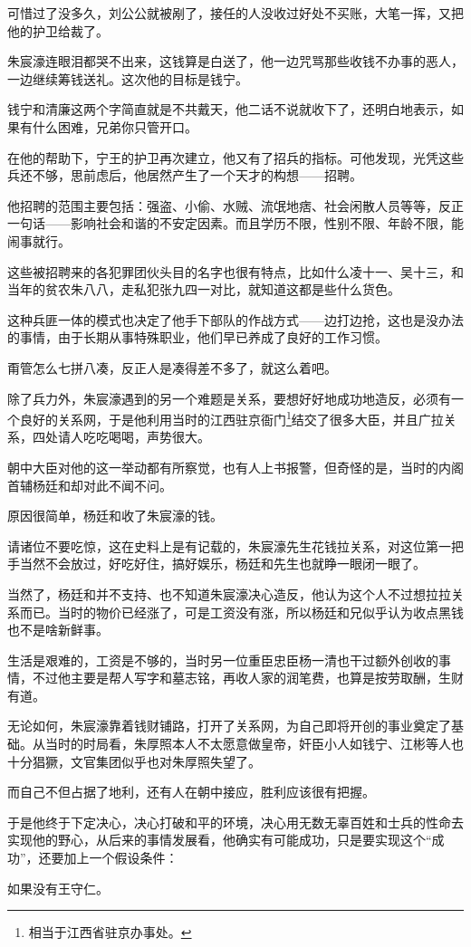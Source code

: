 \begin{multicols}{\theparacolNo}
		可惜过了没多久，刘公公就被剐了，接任的人没收过好处不买账，大笔一挥，又把他的护卫给裁了。

		朱宸濠连眼泪都哭不出来，这钱算是白送了，他一边咒骂那些收钱不办事的恶人，一边继续筹钱送礼。这次他的目标是钱宁。

		钱宁和清廉这两个字简直就是不共戴天，他二话不说就收下了，还明白地表示，如果有什么困难，兄弟你只管开口。

		在他的帮助下，宁王的护卫再次建立，他又有了招兵的指标。可他发现，光凭这些兵还不够，思前虑后，他居然产生了一个天才的构想——招聘。

		他招聘的范围主要包括：强盗、小偷、水贼、流氓地痞、社会闲散人员等等，反正一句话——影响社会和谐的不安定因素。而且学历不限，性别不限、年龄不限，能闹事就行。

		这些被招聘来的各犯罪团伙头目的名字也很有特点，比如什么凌十一、吴十三，和当年的贫农朱八八，走私犯张九四一对比，就知道这都是些什么货色。

		这种兵匪一体的模式也决定了他手下部队的作战方式——边打边抢，这也是没办法的事情，由于长期从事特殊职业，他们早已养成了良好的工作习惯。

		甭管怎么七拼八凑，反正人是凑得差不多了，就这么着吧。

		除了兵力外，朱宸濠遇到的另一个难题是关系，要想好好地成功地造反，必须有一个良好的关系网，于是他利用当时的江西驻京衙门\footnote{相当于江西省驻京办事处。}结交了很多大臣，并且广拉关系，四处请人吃吃喝喝，声势很大。

		朝中大臣对他的这一举动都有所察觉，也有人上书报警，但奇怪的是，当时的内阁首辅杨廷和却对此不闻不问。

		原因很简单，杨廷和收了朱宸濠的钱。

		请诸位不要吃惊，这在史料上是有记载的，朱宸濠先生花钱拉关系，对这位第一把手当然不会放过，好吃好住，搞好娱乐，杨廷和先生也就睁一眼闭一眼了。

		当然了，杨廷和并不支持、也不知道朱宸濠决心造反，他认为这个人不过想拉拉关系而已。当时的物价已经涨了，可是工资没有涨，所以杨廷和兄似乎认为收点黑钱也不是啥新鲜事。

		生活是艰难的，工资是不够的，当时另一位重臣忠臣杨一清也干过额外创收的事情，不过他主要是帮人写字和墓志铭，再收人家的润笔费，也算是按劳取酬，生财有道。

		无论如何，朱宸濠靠着钱财铺路，打开了关系网，为自己即将开创的事业奠定了基础。从当时的时局看，朱厚照本人不太愿意做皇帝，奸臣小人如钱宁、江彬等人也十分猖獗，文官集团似乎也对朱厚照失望了。

		而自己不但占据了地利，还有人在朝中接应，胜利应该很有把握。

		于是他终于下定决心，决心打破和平的环境，决心用无数无辜百姓和士兵的性命去实现他的野心，从后来的事情发展看，他确实有可能成功，只是要实现这个“成功”，还要加上一个假设条件：

		如果没有王守仁。
		\ifnum{}
	\end{multicols}
\fi
\newpage
